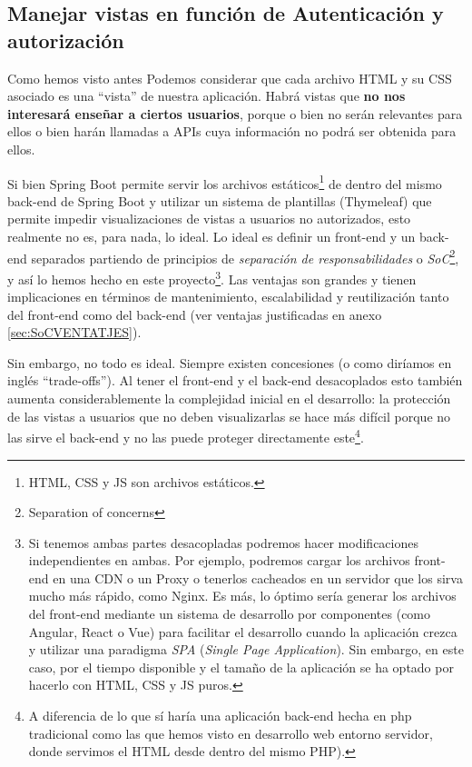 \documentclass[a4paper,12pt]{report}
\begin{document}
	\FloatBarrier
	
	
	
	
	
	
	
	
	\subsection{Manejar vistas en función de Autenticación y autorización}
	
	
	Como hemos visto antes Podemos considerar que cada archivo HTML y su CSS asociado es una ``vista'' de nuestra aplicación. Habrá vistas que \textbf{no nos interesará enseñar a ciertos usuarios}, porque o bien no serán relevantes para ellos o bien harán llamadas a APIs cuya información no podrá ser obtenida para ellos.
	
	Si bien Spring Boot permite servir los archivos estáticos\footnote{HTML, CSS y JS son archivos estáticos.}  de dentro del mismo back-end de Spring Boot y utilizar un sistema de plantillas (Thymeleaf) que permite impedir visualizaciones de vistas a usuarios no autorizados, esto realmente no es, para nada, lo ideal. Lo ideal es definir un front-end y un back-end separados partiendo de principios de \textit{separación de responsabilidades} o \textit{SoC}\footnote{Separation of concerns}, y así lo hemos hecho en este proyecto\footnote{Si tenemos ambas partes desacopladas podremos hacer modificaciones independientes en ambas. Por ejemplo, podremos cargar los archivos front-end en una CDN o un Proxy o tenerlos cacheados en un servidor que los sirva mucho más rápido, como Nginx. Es más, lo óptimo sería generar los archivos del front-end mediante un sistema de desarrollo por componentes (como Angular, React o Vue) para facilitar el desarrollo cuando la aplicación crezca y utilizar una paradigma \textit{SPA} (\textit{Single Page Application}). Sin embargo, en este caso, por el tiempo disponible y el tamaño de la aplicación se ha optado por hacerlo con HTML, CSS y JS puros.}. Las ventajas son grandes y tienen implicaciones en términos de mantenimiento, escalabilidad y reutilización tanto del front-end como del back-end (ver ventajas justificadas en anexo \ref{sec:SoCVENTATJES}).
	

	
	
	
	
	Sin embargo, no todo es ideal. Siempre existen concesiones (o como diríamos en inglés ``trade-offs''). Al tener el front-end y el back-end desacoplados esto también aumenta considerablemente la complejidad inicial en el desarrollo: la protección de las vistas a usuarios que no deben visualizarlas se hace más difícil porque no las sirve el back-end y no las puede proteger directamente este\footnote{A diferencia de lo que sí haría una aplicación back-end hecha en php tradicional como las que hemos visto en desarrollo web entorno servidor, donde servimos el HTML desde dentro del mismo PHP).}.
	
\end{document}
